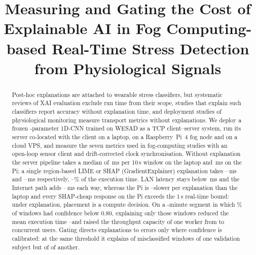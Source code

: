 \documentclass[conference]{IEEEtran}
\newcommand{\ms}{\,ms\xspace}
\begin{document}
\title{Measuring and Gating the Cost of Explainable AI in Fog
Computing-based Real-Time Stress Detection from Physiological Signals}

\author{%
}

\maketitle

\begin{abstract}
Post-hoc explanations are attached to wearable stress classifiers, but
systematic reviews of XAI evaluation exclude run time from their scope,
studies that explain such classifiers report accuracy without explanation
time, and deployment studies of physiological monitoring measure transport
metrics without explanations. We deploy a frozen \NParams-parameter 1D-CNN trained
on WESAD as a TCP client--server system, run its server co-located with
the client on a laptop, on a Raspberry~Pi~4 fog node and on a cloud VPS,
and measure the seven metrics used in fog-computing studies with an
open-loop sensor client and drift-corrected clock synchronisation.
Without explanation the server pipeline takes a median of
\ColocNoneExecMed\ms per 10\,s window on the laptop and \FogNoneExecMed\ms
on the Pi; a single region-based LIME or SHAP (GradientExplainer)
explanation takes \ColocXaiMin--\ColocXaiMax\ms and
\FogXaiMin--\FogXaiMax\ms respectively,
\XaiShareMin--\XaiShareMax\% of the execution time. LAN latency stays
below \LatMaxAll\ms and the Internet path adds
\CloudNetMin--\CloudNetMax\ms each way, whereas the Pi is
\FogOverColocXaiLimeC--\FogOverColocXaiShap\x slower per explanation
than the laptop and every SHAP-cheap response on the Pi exceeds the 1\,s
real-time bound: under explanation, placement is a compute decision. On a
\SelMinutes-minute segment in which \SelShapCRate\% of windows had
confidence below 0.80, explaining only those windows reduced the mean
execution time \SelExecGainMin--\SelExecGainMax\x and raised the throughput
capacity of one worker from \FogODShapCCap to \SelShapCCap concurrent users.
Gating directs explanations to errors only where confidence is calibrated:
at the same threshold it explains \CaughtElevenEighty of
\ErrorsElevenEighty misclassified windows of one validation subject but
\CaughtFourteenEighty of \ErrorsFourteenEighty of another.
\end{abstract}
\end{document}
